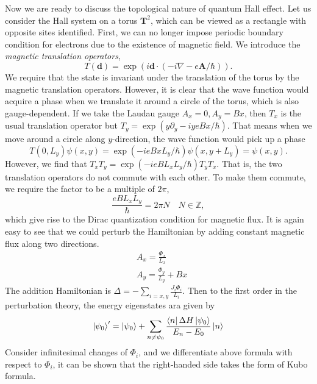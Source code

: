 \documentclass[12pt,a4paper]{article}
\numberwithin{equation}{section}
\begin{document}
Now we are ready to discuss the topological nature of quantum Hall effect. Let us consider the Hall system on a torus $\mathbf{T}^2$, which can be viewed as a rectangle with opposite sites identified.
First, we can no longer impose periodic boundary condition for electrons due to the existence of magnetic field. We introduce the \textit{magnetic translation operators},
\begin{equation}
    T(\mathbf{d}) = \exp(i\mathbf{d}\cdot (-i\nabla - e\mathbf{A}/\hbar)).
\end{equation}
We require that the state is invariant under the translation of the torus by the magnetic translation operators. However, it is clear that the wave function would acquire a phase when we translate it around a circle of the torus,
which is also gauge-dependent. If we take the Laudau gauge $A_x=0, A_y = Bx$, then $T_x$ is the usual translation operator but $T_y = \exp(y\partial_y - iyeBx/\hbar)$. That means when we move around a circle along $y$-direction, 
the wave function would pick up a phase 
\begin{equation}
    T(0,L_y)\psi(x,y) = \exp(-ieBxL_y/\hbar)\psi(x,y+L_y) = \psi(x,y).
\end{equation}
However, we find that $T_xT_y = \exp(-i e B L_x L_y/\hbar) T_y T_x$. That is, the two translation operators do not commute with each other. To make them commute, we require the factor to be a multiple of $2\pi$,
\begin{equation}
    \frac{eBL_xL_y}{\hbar} = 2\pi N \quad N \in \mathbb{Z},
\end{equation}
which give rise to the Dirac quantization condition for magnetic flux. It is again easy to see that we could perturb the Hamiltonian by adding constant magnetic flux along two directions.
\begin{equation}
    \begin{aligned}
        & A_x = \frac{\Phi_x}{L_x} \\
        & A_y = \frac{\Phi_y}{L_y} + Bx
    \end{aligned}
\end{equation}
The addition Hamiltonian is $\Delta = - \sum\limits_{i=x,y}\frac{J_i\Phi_i}{L_i}$. Then to the first order in the perturbation theory, the energy eigenstates ara given by
\begin{equation}
    \ket{\psi_0}' = \ket{\psi_0} + \sum_{n\neq \psi_0} \frac{\bra{n}\Delta H\ket{\psi_0}}{E_n-E_0}\ket{n}
\end{equation}
Consider infinitesimal changes of $\Phi_i$, and we differentiate above formula with respect to $\Phi_i$, it can be shown that the right-handed side takes the form of Kubo formula.
\end{document}
